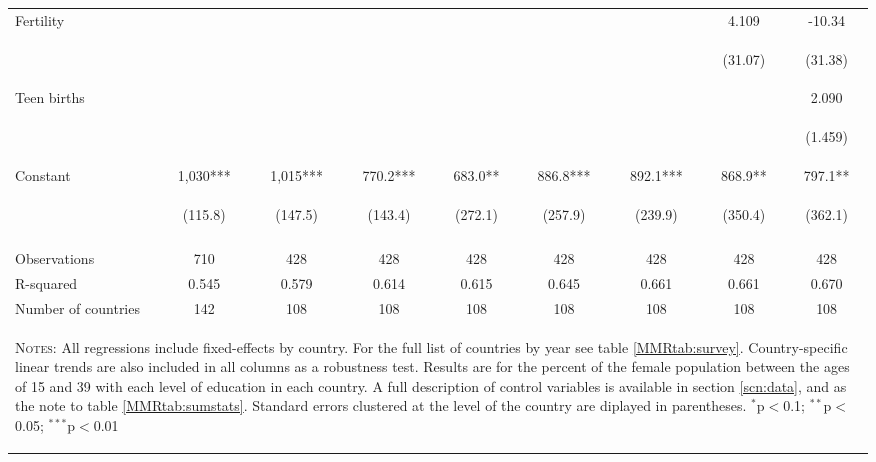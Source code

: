 \begin{landscape}
\begin{table}[htpb!]
\begin{center}
\begin{tabular}{lcccccccc}
Fertility&&&&&&&4.109&-10.34\\
&&&&&&&\begin{footnotesize}(31.07)\end{footnotesize}&\begin{footnotesize}(31.38)\end{footnotesize}\\
Teen births&&&&&&&&2.090\\
&&&&&&&&\begin{footnotesize}(1.459)\end{footnotesize}\\
Constant&1,030***&1,015***&770.2***&683.0**&886.8***&892.1***&868.9**&797.1**\\
&\begin{footnotesize}(115.8)\end{footnotesize}&\begin{footnotesize}(147.5)\end{footnotesize}&\begin{footnotesize}(143.4)\end{footnotesize}&\begin{footnotesize}(272.1)\end{footnotesize}&\begin{footnotesize}(257.9)\end{footnotesize}&\begin{footnotesize}(239.9)\end{footnotesize}&\begin{footnotesize}(350.4)\end{footnotesize}&\begin{footnotesize}(362.1)\end{footnotesize}\\
&&&&&&&&\\
Observations&710&428&428&428&428&428&428&428\\
R-squared&0.545&0.579&0.614&0.615&0.645&0.661&0.661&0.670\\
Number of countries&142&108&108&108&108&108&108&108\\
\midrule
\multicolumn{9}{p{20cm}}{\begin{footnotesize}\textsc{Notes:} All regressions include fixed-effects by country. For the full list of countries by year see table \ref{MMRtab:survey}. Country-specific linear trends are also included in all columns as a  robustness test. Results are for the percent of the female population between the ages of 15 and 39 with each level of education in each country.  A full description of control variables is available in section \ref{scn:data}, and as the note to table \ref{MMRtab:sumstats}.  Standard errors clustered at the  level of the country are diplayed in parentheses.
$^{*}$p$<$0.1; $^{**}$p$<$0.05; $^{***}$p$<$0.01\end{footnotesize}} \\ \bottomrule 
\end{tabular}\end{center}\end{table}\end{landscape}
